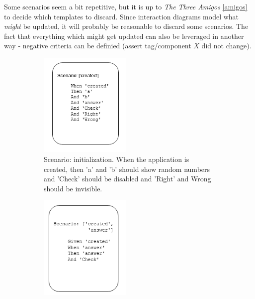 Some scenarios seem a bit repetitive, but it is up to \textit{The Three Amigos} \ref{amigos} to decide which templates to discard. Since interaction diagrams model what \textit{might} be updated, it will probably be reasonable to discard some scenarios. The fact that everything which might get updated can also be leveraged in another way - negative criteria can be definied (assert tag/component $X$ did not change).
\begin{figure}[H]
    \label{fig:eval_scenarios_0}
    \caption{Gherkin scenarios templates and sample human written scenarios based on the templates }
    \centering
    \begin{subfigure}[b]{0.48\textwidth}
         \centering
         \includegraphics[width=0.48\textwidth]{images/scenarios_1.png}
         \caption{Scenario: initialization. When the application is created, then 'a' and 'b' should show random numbers and 'Check' should be disabled and 'Right' and Wrong should be invisible.}
    \end{subfigure}\hfill%
    \begin{subfigure}[b]{0.48\textwidth}
        \centering
        \includegraphics[width=0.48\textwidth]{images/scenarios_2.png}

\end{subfigure}
\end{figure}
